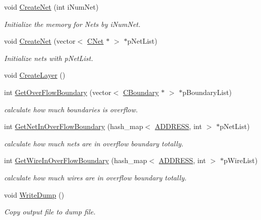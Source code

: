 \begin{DoxyCompactItemize}
void \mbox{\hyperlink{classCDesign_a844b18267aad1895dc66e3208b36d21b}{Create\+Net}} (int i\+Num\+Net)
\begin{DoxyCompactList}\small\item\em Initialize the memory for Nets by i\+Num\+Net. \end{DoxyCompactList}\item 
void \mbox{\hyperlink{classCDesign_a961dbd6912b3ef52ff673b60342f51a6}{Create\+Net}} (vector$<$ \mbox{\hyperlink{classCNet}{C\+Net}} $\ast$ $>$ $\ast$p\+Net\+List)
\begin{DoxyCompactList}\small\item\em Initialize nets with p\+Net\+List. \end{DoxyCompactList}\item 
void \mbox{\hyperlink{classCDesign_af116ba8573daa936d633b5ea0b005637}{Create\+Layer}} ()
\item 
int \mbox{\hyperlink{classCDesign_af264117726c361d0404dcd97c6da2c35}{Get\+Over\+Flow\+Boundary}} (vector$<$ \mbox{\hyperlink{classCBoundary}{C\+Boundary}} $\ast$ $>$ $\ast$p\+Boundary\+List)
\begin{DoxyCompactList}\small\item\em calculate how much boundaries is overflow. \end{DoxyCompactList}\item 
int \mbox{\hyperlink{classCDesign_ab3fcdbedca2a1f107507ec6bd7f4677a}{Get\+Net\+In\+Over\+Flow\+Boundary}} (hash\+\_\+map$<$ \mbox{\hyperlink{BoxRouter_8h_a280feb883e9d4a7edcc69c8bcb9f38f2}{A\+D\+D\+R\+E\+SS}}, int $>$ $\ast$p\+Net\+List)
\begin{DoxyCompactList}\small\item\em calculate how much nets are in overflow boundary totally. \end{DoxyCompactList}\item 
int \mbox{\hyperlink{classCDesign_acd4fc20284f55855b4e88d89cc03b058}{Get\+Wire\+In\+Over\+Flow\+Boundary}} (hash\+\_\+map$<$ \mbox{\hyperlink{BoxRouter_8h_a280feb883e9d4a7edcc69c8bcb9f38f2}{A\+D\+D\+R\+E\+SS}}, int $>$ $\ast$p\+Wire\+List)
\begin{DoxyCompactList}\small\item\em calculate how much wires are in overflow boundary totally. \end{DoxyCompactList}\item 
void \mbox{\hyperlink{classCDesign_a984162e6e0b47da02f4a34e176f0a569}{Write\+Dump}} ()
\begin{DoxyCompactList}\small\item\em Copy output file to dump file. \end{DoxyCompactList}\item 

\end{DoxyCompactItemize}
